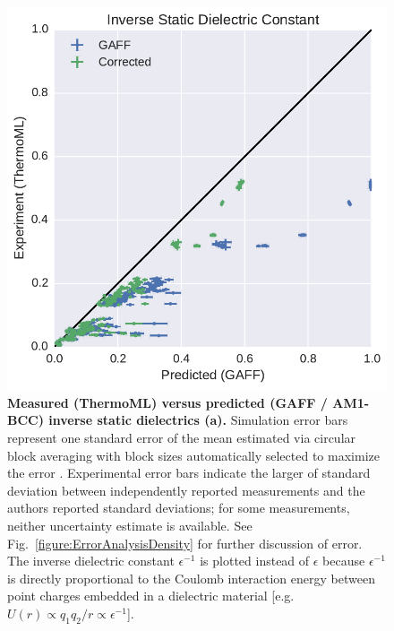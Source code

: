 \documentclass[aps,pre,twocolumn,nofootinbib,superscriptaddress,linenumbers]{revtex4-1}
\begin{document}
\begin{figure}
\includegraphics[width=\columnwidth]{./figures/dielectrics_thermoml.pdf}

\caption{{\bf Measured (ThermoML) versus predicted (GAFF / AM1-BCC) inverse static dielectrics (a).}
Simulation error bars represent one standard error of the mean estimated via circular block averaging \cite{sheppard_2015_15681} with block sizes automatically selected to maximize the error \cite{flyvbjerg1989error}.  
Experimental error bars indicate the larger of standard deviation between independently reported measurements and the authors reported standard deviations; for some measurements, neither uncertainty estimate is available.  
See Fig.~\ref{figure:ErrorAnalysisDensity} for further discussion of error.  
The inverse dielectric constant $\epsilon^{-1}$ is plotted instead of $\epsilon$ because $\epsilon^{-1}$ is directly proportional to the Coulomb interaction energy between point charges embedded in a dielectric material [e.g. $U(r) \propto q_1 q_2 / r \propto \epsilon^{-1}$].
}
\label{figure:Dielectric}
\end{figure}

\end{document}
